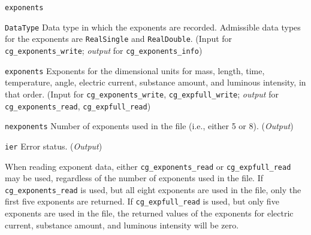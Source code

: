 \begin{Ventryi}{\texttt{exponents}}\raggedright
\item [\texttt{DataType}]
      Data type in which the exponents are recorded.
      Admissible data types for the exponents are \texttt{RealSingle}
      and \texttt{RealDouble}.
      (\textcolor{input}{Input} for \texttt{cg\_exponents\_write};
      \textcolor{output}{\textit{output}} for \texttt{cg\_exponents\_info})
\item [\texttt{exponents}]
      Exponents for the dimensional units for mass, length, time,
      temperature, angle, electric current, substance amount, and
      luminous intensity, in that order.
      (\textcolor{input}{Input} for \texttt{cg\_exponents\_write},
      \texttt{cg\_expfull\_write};
      \textcolor{output}{\textit{output}} for \texttt{cg\_exponents\_read},
      \texttt{cg\_expfull\_read})
\item [\texttt{nexponents}]
      Number of exponents used in the file (i.e., either 5 or 8).
      (\textcolor{output}{\textit{Output}})
\item [\texttt{ier}]
      Error status.
      (\textcolor{output}{\textit{Output}})
\end{Ventryi}

When reading exponent data, either \texttt{cg\_exponents\_read} or
\texttt{cg\_expfull\_read} may be used, regardless of the number of
exponents used in the file.
If \texttt{cg\_exponents\_read} is used, but all eight exponents are used
in the file, only the first five exponents are returned.
If \texttt{cg\_expfull\_read} is used, but only five exponents are used
in the file, the returned values of the exponents for electric current,
substance amount, and luminous intensity will be zero.
